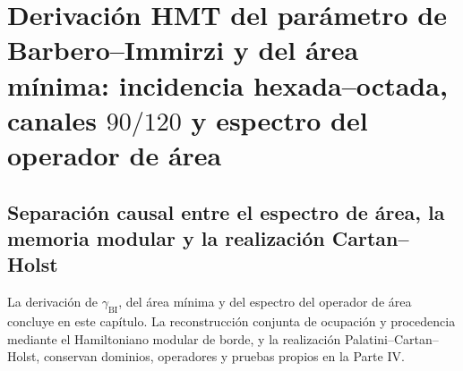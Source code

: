 \chapter{Derivación HMT del parámetro de Barbero--Immirzi y del área mínima: incidencia hexada--octada, canales \(90/120\) y espectro del operador de área}
\label{chap:p3-final:51:barbero_area}






\section{Separación causal entre el espectro de área, la memoria modular y la realización Cartan--Holst}
La derivación de $\gamma_{\mathrm{BI}}$, del área mínima y del espectro del operador de área concluye en este capítulo. La reconstrucción conjunta de ocupación y procedencia mediante el Hamiltoniano modular de borde, y la realización Palatini--Cartan--Holst, conservan dominios, operadores y pruebas propios en la Parte IV.
